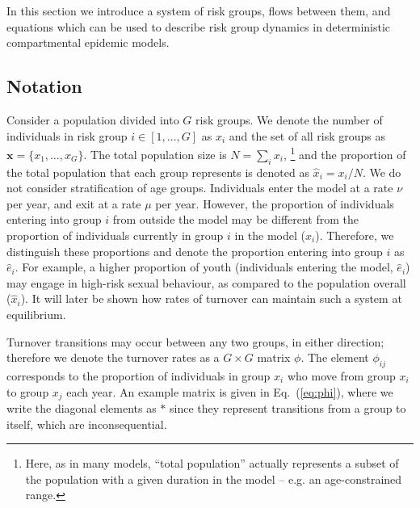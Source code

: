 In this section we introduce a system of
risk groups, flows between them, and equations
which can be used to describe risk group dynamics
in deterministic compartmental epidemic models.
\subsection{Notation}
Consider a population divided into $G$ risk groups.
We denote the number of individuals in risk group $i \in [1, \dots, G]$ as $x_i$
and the set of all risk groups as $\bm{x} = \{x_1, \dots, x_G\}$.
The total population size is $N = \sum_i {x_i}$,%
\footnote{Here, as in many models, ``total population'' actually represents
  a subset of the population with a given duration in the model --
  e.g. an age-constrained range.}
and the proportion of the total population that each group represents
is denoted as $\hat{x}_i = x_i / N$.
We do not consider stratification of age groups.
Individuals enter the model at a rate $\nu$ per year,
and exit at a rate $\mu$ per year.
However, the proportion of individuals entering into group $i$ from outside the model
may be different from
the proportion of individuals currently in group $i$ in the model ($\hat{x}_i$).
Therefore, we distinguish these proportions
and denote the proportion entering into group $i$ as $\hat{e}_i$.
For example, a higher proportion of youth (individuals entering the model, $\hat{e}_i$)
may engage in high-risk sexual behaviour,
as compared to the population overall ($\hat{x}_i$).
It will later be shown how rates of turnover can maintain such a system at equilibrium.
\par
Turnover transitions may occur between any two groups, in either direction;
therefore we denote the turnover rates as a $G \times G$ matrix $\phi$.
The element $\phi_{ij}$ corresponds to the proportion of individuals in group $x_i$
who move from group $x_i$ to group $x_j$ each year.
An example matrix is given in Eq.~(\ref{eq:phi}),
where we write the diagonal elements as $*$ since they represent
transitions from a group to itself, which are inconsequential.
